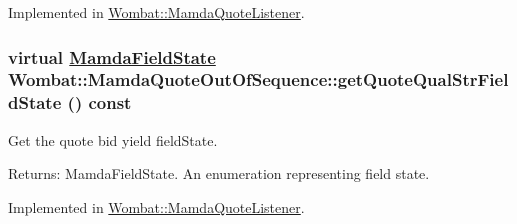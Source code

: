 Implemented in \hyperlink{classWombat_1_1MamdaQuoteListener_e33ca4e1fa76fb882185676c0d865be7}{Wombat::Mamda\-Quote\-Listener}.\hypertarget{classWombat_1_1MamdaQuoteOutOfSequence_d8ffb3eab13dd519e846dc59c387924b}{
\subsubsection[getQuoteQualStrFieldState]{\setlength{\rightskip}{0pt plus 5cm}virtual \hyperlink{namespaceWombat_93aac974f2ab713554fd12a1fa3b7d2a}{Mamda\-Field\-State} Wombat::Mamda\-Quote\-Out\-Of\-Sequence::get\-Quote\-Qual\-Str\-Field\-State () const}}
\label{classWombat_1_1MamdaQuoteOutOfSequence_d8ffb3eab13dd519e846dc59c387924b}


Get the quote bid yield field\-State. 

\begin{Desc}
\item[Returns:]Mamda\-Field\-State. An enumeration representing field state. \end{Desc}


Implemented in \hyperlink{classWombat_1_1MamdaQuoteListener_90a6df719e3f391f19edf4796f947b35}{Wombat::Mamda\-Quote\-Listener}.